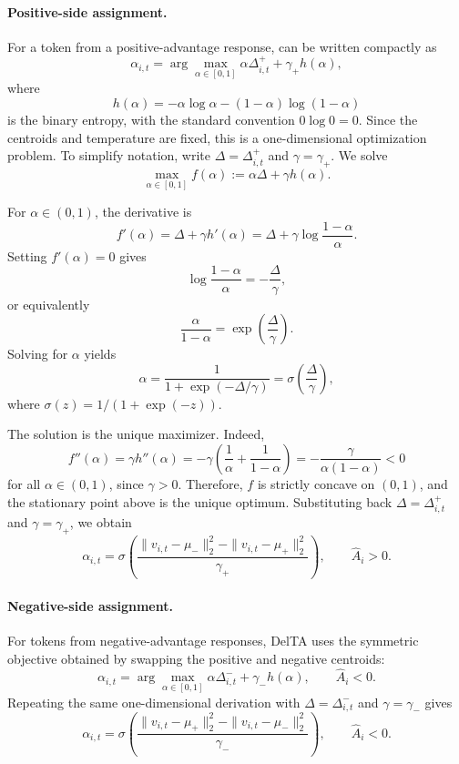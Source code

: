 \documentclass{article} %
\begin{document}
\paragraph{Positive-side assignment.}
For a token from a positive-advantage response,
 can be written compactly as
\[
\alpha_{i,t}
=
\arg\max_{\alpha\in[0,1]}
\alpha \Delta_{i,t}^{+}
+
\gamma_+ h(\alpha),
\]
where
\[
h(\alpha)
=
-\alpha\log\alpha-(1-\alpha)\log(1-\alpha)
\]
is the binary entropy, with the standard convention \(0\log 0=0\). Since the
centroids and temperature are fixed, this is a one-dimensional optimization
problem. To simplify notation, write
\(\Delta=\Delta_{i,t}^{+}\) and \(\gamma=\gamma_+\). We solve
\[
\max_{\alpha\in[0,1]}
f(\alpha)
:=
\alpha\Delta+\gamma h(\alpha).
\]

For \(\alpha\in(0,1)\), the derivative is
\[
f'(\alpha)
=
\Delta+\gamma h'(\alpha)
=
\Delta+\gamma\log\frac{1-\alpha}{\alpha}.
\]
Setting \(f'(\alpha)=0\) gives
\[
\log\frac{1-\alpha}{\alpha}
=
-\frac{\Delta}{\gamma},
\]
or equivalently
\[
\frac{\alpha}{1-\alpha}
=
\exp\!\left(\frac{\Delta}{\gamma}\right).
\]
Solving for \(\alpha\) yields
\[
\alpha
=
\frac{1}{1+\exp(-\Delta/\gamma)}
=
\sigma\!\left(\frac{\Delta}{\gamma}\right),
\]
where \(\sigma(z)=1/(1+\exp(-z))\).

The solution is the unique maximizer. Indeed,
\[
f''(\alpha)
=
\gamma h''(\alpha)
=
-\gamma
\left(
\frac{1}{\alpha}
+
\frac{1}{1-\alpha}
\right)
=
-\frac{\gamma}{\alpha(1-\alpha)}
<0
\]
for all \(\alpha\in(0,1)\), since \(\gamma>0\). Therefore, \(f\) is strictly
concave on \((0,1)\), and the stationary point above is the unique optimum.
Substituting back \(\Delta=\Delta_{i,t}^{+}\) and \(\gamma=\gamma_+\), we obtain
\[
\alpha_{i,t}
=
\sigma\!\left(
\dfrac{
\|v_{i,t}-\mu_-\|_2^2
-
\|v_{i,t}-\mu_+\|_2^2
}{
\gamma_+
}
\right),
\qquad
\hat A_i>0.
\]

\paragraph{Negative-side assignment.}
For tokens from negative-advantage responses, DelTA uses the symmetric objective
obtained by swapping the positive and negative centroids:
\[
\alpha_{i,t}
=
\arg\max_{\alpha\in[0,1]}
\alpha \Delta_{i,t}^{-}
+
\gamma_- h(\alpha),
\qquad
\hat A_i<0.
\]
Repeating the same one-dimensional derivation with
\(\Delta=\Delta_{i,t}^{-}\) and \(\gamma=\gamma_-\) gives
\[
\alpha_{i,t}
=
\sigma\!\left(
\dfrac{
\|v_{i,t}-\mu_+\|_2^2
-
\|v_{i,t}-\mu_-\|_2^2
}{
\gamma_-
}
\right),
\qquad
\hat A_i<0.
\]
\end{document}
